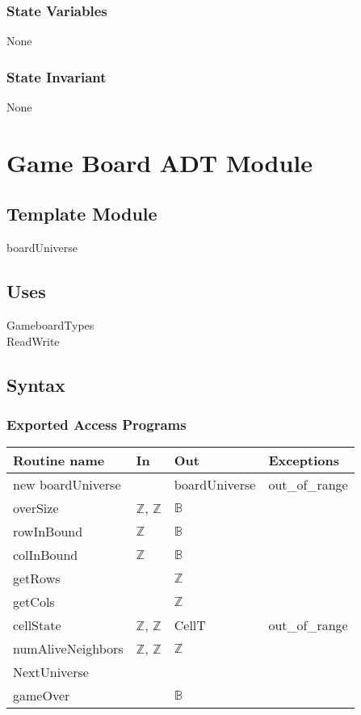\documentclass[12pt]{article}
\begin{document}
\subsubsection* {State Variables}

None

\subsubsection* {State Invariant}

None

\newpage

\section* {Game Board ADT Module}

\subsection*{Template Module}

boardUniverse

\subsection* {Uses}

\noindent GameboardTypes\\
\noindent ReadWrite\\

\subsection* {Syntax}

\subsubsection* {Exported Access Programs}

\begin{tabular}{| l | l | l | l |}
\hline
\textbf{Routine name} & \textbf{In} & \textbf{Out} & \textbf{Exceptions}\\
\hline
new boardUniverse & ~ & boardUniverse & out\_of\_range\\
\hline
overSize & $\mathbb{Z}$, $\mathbb{Z}$ & $\mathbb{B}$ & ~ \\
\hline
rowInBound & $\mathbb{Z}$ & $\mathbb{B}$ & ~ \\
\hline
colInBound & $\mathbb{Z}$ &  $\mathbb{B}$ & ~ \\
\hline
getRows & ~ & $\mathbb{Z}$ & ~ \\
\hline
getCols & ~ & $\mathbb{Z}$ & ~ \\
\hline
cellState & $\mathbb{Z}$, $\mathbb{Z}$ & CellT & out\_of\_range\\
\hline
numAliveNeighbors & $\mathbb{Z}$, $\mathbb{Z}$ & $\mathbb{Z}$ & ~ \\
\hline
NextUniverse & ~ & ~ & ~ \\
\hline
gameOver &  & $\mathbb{B}$ & \\
\hline
\end{tabular}
\end{document}
